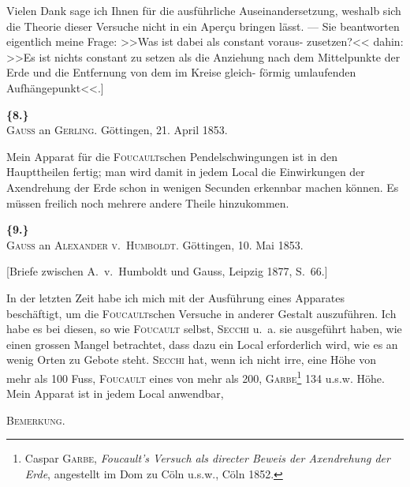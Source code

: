 \documentclass[12pt,a4paper]{article}
\theoremstyle{plain}
\theoremstyle{definition}
\theoremstyle{remark}
\begin{document}
Vielen Dank sage ich Ihnen f\"ur die ausf\"uhrliche Auseinandersetzung,
weshalb sich die Theorie dieser Versuche nicht in ein Aper\c{c}u bringen l\"asst. ---
Sie beantworten eigentlich meine Frage: >>Was ist dabei als constant voraus-
zusetzen?<< dahin: >>Es ist nichts constant zu setzen als die Anziehung nach
dem Mittelpunkte der Erde und die Entfernung von dem im Kreise gleich-
f\"ormig umlaufenden Aufh\"angepunkt<<.]

\vspace{0.5cm}

\noindent\textbf{\{8.\}}\\
\textsc{Gauss} an \textsc{Gerling}. G\"ottingen, 21. April 1853.

\vspace{0.3cm}

Mein Apparat f\"ur die \textsc{Foucault}schen Pendelschwingungen ist in den
Haupttheilen fertig; man wird damit in jedem Local die Einwirkungen der
Axendrehung der Erde schon in wenigen Secunden erkennbar machen
k\"onnen. Es m\"ussen freilich noch mehrere andere Theile hinzukommen.

\vspace{0.5cm}

\noindent\textbf{\{9.\}}\\
\textsc{Gauss} an \textsc{Alexander v.~Humboldt}. G\"ottingen, 10. Mai 1853.

\vspace{0.2cm}
{\small[Briefe zwischen A.~v.~Humboldt und Gauss, Leipzig 1877, S.~66.]}

\vspace{0.3cm}

In der letzten Zeit habe ich mich mit der Ausf\"uhrung eines Apparates
besch\"aftigt, um die \textsc{Foucault}schen Versuche in anderer Gestalt auszuf\"uhren.
Ich habe es bei diesen, so wie \textsc{Foucault} selbst, \textsc{Secchi} u.~a. sie ausgef\"uhrt
haben, wie einen grossen Mangel betrachtet, dass dazu ein Local erforderlich
wird, wie es an wenig Orten zu Gebote steht. \textsc{Secchi} hat, wenn ich nicht
irre, eine H\"ohe von mehr als 100 Fuss, \textsc{Foucault} eines von mehr als 200,
\textsc{Garbe}\footnote{Caspar \textsc{Garbe}, \textit{Foucault's Versuch als directer Beweis der Axendrehung der Erde}, angestellt
im Dom zu C\"oln u.s.w., C\"oln 1852.} 134 u.s.w. H\"ohe. Mein Apparat ist in jedem Local anwendbar,

\vspace{0.5cm}
\begin{center}
\textsc{Bemerkung.}
\end{center}
\vspace{0.2cm}
\end{document}
